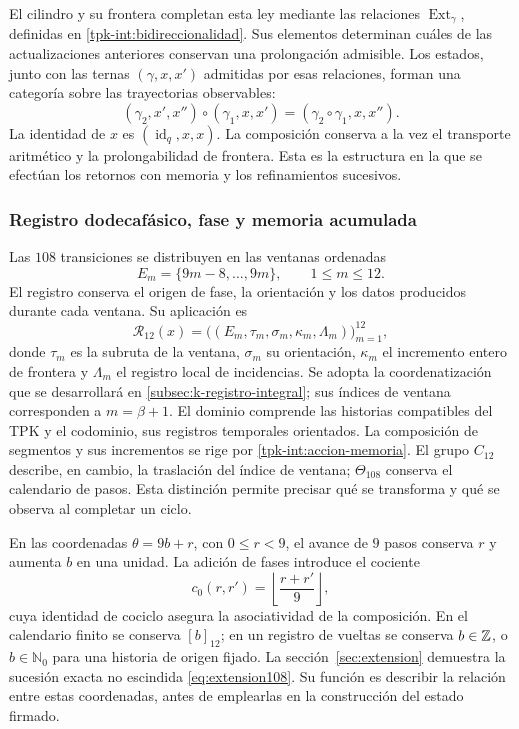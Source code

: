 El cilindro y su frontera completan esta ley mediante las relaciones
\(\operatorname{Ext}_\gamma\), definidas en
\ref{tpk-int:bidireccionalidad}. Sus elementos determinan cuáles de
las actualizaciones anteriores conservan una prolongación admisible.
Los estados, junto con las ternas \((\gamma,x,x')\) admitidas por
esas relaciones, forman una categoría sobre las trayectorias observables:
\[
 (\gamma_2,x',x'')\circ(\gamma_1,x,x')
     =(\gamma_2\circ\gamma_1,x,x'').
\]
La identidad de \(x\) es \((\operatorname{id}_q,x,x)\).
La composición conserva a la vez el transporte aritmético y la
prolongabilidad de frontera. Esta es la estructura en la que se efectúan
los retornos con memoria y los refinamientos sucesivos.

\subsubsection{Registro dodecafásico, fase y memoria acumulada}
\label{tpk-int:dodecafase}

Las \(108\) transiciones se distribuyen en las ventanas ordenadas
\[
 E_m=\{9m-8,\ldots,9m\},\qquad 1\leq m\leq12.
\]
El registro conserva el origen de fase, la orientación y los datos
producidos durante cada ventana. Su aplicación es
\[
 \mathcal R_{12}(x)=
 \bigl((E_m,\tau_m,\sigma_m,\kappa_m,\Lambda_m)\bigr)_{m=1}^{12},
\]
donde \(\tau_m\) es la subruta de la ventana, \(\sigma_m\) su
orientación, \(\kappa_m\) el incremento entero de frontera y
\(\Lambda_m\) el registro local de incidencias. Se adopta la coordenatización
que se desarrollará en \ref{subsec:k-registro-integral}; sus índices
de ventana corresponden a \(m=\beta+1\).
El dominio comprende las historias compatibles
del TPK y el codominio, sus registros temporales orientados. La
composición de segmentos y sus incrementos se rige por
\eqref{tpk-int:accion-memoria}. El grupo \(C_{12}\) describe, en
cambio, la traslación del índice de ventana; \(\Theta_{108}\) conserva
el calendario de pasos. Esta distinción permite precisar qué se transforma
y qué se observa al completar un ciclo.

En las coordenadas \(\theta=9b+r\), con \(0\leq r<9\), el avance
de \(9\) pasos conserva \(r\) y aumenta \(b\) en una unidad.
La adición de fases introduce el cociente
\[
 c_0(r,r')=\left\lfloor\frac{r+r'}9\right\rfloor,
\]
cuya identidad de cociclo asegura la asociatividad de la composición.
En el calendario finito se conserva \([b]_{12}\); en un registro de
vueltas se conserva \(b\in\mathbb Z\), o \(b\in\mathbb N_0\) para
una historia de origen fijado. La sección~\ref{sec:extension} demuestra
la sucesión exacta no escindida \eqref{eq:extension108}. Su función es
describir la relación entre estas coordenadas, antes de emplearlas en la
construcción del estado firmado.

